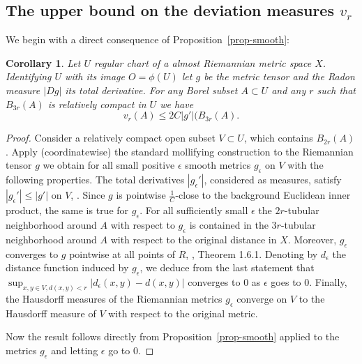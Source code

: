 \documentclass[12pt,leqno]{amsart}
\numberwithin{equation}{section}
\newtheorem{cor}[thm]{Corollary}
\theoremstyle{definition}
\theoremstyle{remark}
\newcommand{\pref}[1]{Proposition~\ref{#1}}
\begin{document}










\subsection{The upper bound on the deviation  measures $v_r$}
We begin with a direct consequence of \pref{prop-smooth}:
\begin{cor} \label{cor-dc-vr}
Let $U$ regular chart of a almost Riemannian metric space $X$. Identifying $U$ with its image $O=\phi (U)$ let
$g$ be the metric tensor and the Radon measure $|Dg|$ its total derivative.  For any Borel subset $A\subset U$ and any $r$
such that $B_{3r} (A)$ is relatively compact in $U$ we have $$v_r (A) \leq 2 C |g'| (B_{3r} (A) .$$
\end{cor}

\begin{proof}
Consider a relatively compact open subset $ V \subset U$, which contains $B_{2r} (A)$.  Apply (coordinatewise) the standard mollifying construction
to the Riemannian tensor $g$ we obtain for all small positive $\epsilon$  smooth metrics $g_{\epsilon}$ on $V$ with the following properties.
The total derivatives $|g_{\epsilon} '|$, considered as measures, satisfy  $|g_{\epsilon} '|\leq |g'|$ on $V$, \cite[Theorem 5.3.1]{Ziemer}.   Since $g$ is pointwise   $\frac 1 C$-close to the background Euclidean inner product, the same is true for  $g_{\epsilon}$.  For all sufficiently small $\epsilon$ the $2r$-tubular neighborhood around $A$ with respect to $g_{\epsilon}$ is contained in the $3r$-tubular neighborhood around $A$ with respect to the original distance in $X$. Moreover, $g_{\epsilon}$ converges to $g$ pointwise at all points of $R$, \cite{Ziemer}, Theorem 1.6.1.
Denoting by $d_{\epsilon}$ the distance function induced by $g_{\epsilon}$, we deduce from the last statement that $\sup _{x,y \in V, d(x,y) <r} |d_{\epsilon} (x,y) -d(x,y)|$ converges to $0$ as $\epsilon$ goes to $0$. Finally, the Hausdorff measures of the Riemannian metrics $g_{\epsilon}$ converge on $V$ to the Hausdorff measure of $V$ with respect to the original metric.

 Now the result follows directly  from \pref{prop-smooth} applied to the metrics $g_{\epsilon}$ and letting $\epsilon$ go to $0$.
\end{proof}
\end{document}

